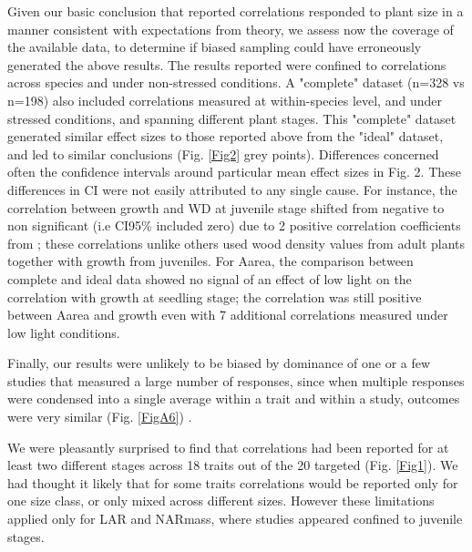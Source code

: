 \documentclass[a4paper]{article}\usepackage[]{graphicx}\usepackage[]{color}
\begin{document}
Given our basic conclusion that reported correlations responded to plant size in a manner consistent with expectations from theory, we assess now the coverage of the available data, to determine if biased sampling could have erroneously generated the above results. The results reported were confined to correlations across species and under non-stressed conditions. A "complete" dataset (n=328 vs n=198) also included correlations measured at within-species level, and under stressed conditions, and spanning different plant stages. This "complete" dataset generated similar effect sizes to those reported above from the "ideal" dataset, and led to similar conclusions (Fig. \ref{Fig2} grey points). Differences concerned often the confidence intervals around particular mean effect sizes in Fig. 2. These differences in CI were not easily attributed to any single cause. For instance, the correlation between growth and WD at juvenile stage shifted from negative to non significant (i.e CI95\% included zero) due to 2 positive correlation coefficients from \citet{Augspurger:1984ct};  these correlations unlike others used wood density values from adult plants together with growth from juveniles. For Aarea, the comparison between complete and ideal data showed no signal of an effect of low light on the correlation with growth at seedling stage; the correlation was still positive between Aarea and growth even with 7 additional correlations measured under low light conditions.

Finally, our results were unlikely to be biased by dominance of one or a few studies that measured a large number of responses, since when multiple responses were condensed into a single average within a trait and within a study, outcomes were very similar (Fig. \ref{FigA6}) .


We were pleasantly surprised to find that correlations had been reported for at least two different stages across 18 traits out of the 20 targeted (Fig. \ref{Fig1}). We had thought it likely that for some traits correlations would be reported only for one size class, or only mixed across different sizes. However these limitations applied only for LAR and NARmass, where studies appeared confined to juvenile stages.
\end{document}
